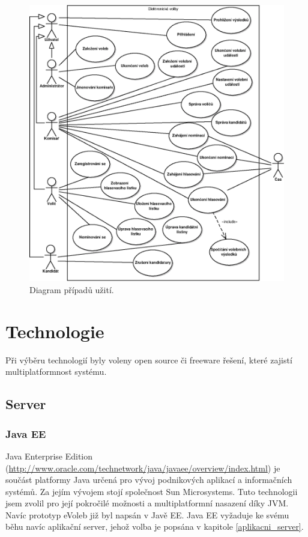 \documentclass[11pt,twoside,a4paper]{book}
\begin{document}
\begin{figure}[h!]
	\centering
	\includegraphics[scale=0.9]{diagrams/pripady_uziti.eps}
	\caption{Diagram případů užití.}
	\label{fig:pripady_uziti}
\end{figure}


\section{Technologie}

Při výběru technologií byly voleny open source či freeware řešení, které zajistí multiplatformnost systému.

\subsection{Server}

\subsubsection{Java EE}

Java Enterprise Edition (\url{http://www.oracle.com/technetwork/java/javaee/overview/index.html}) je součást platformy Java určená pro vývoj podnikových aplikací a informačních systémů. Za jejím vývojem stojí společnost Sun Microsystems. Tuto technologii jsem zvolil pro její pokročilé možnosti a multiplatformní nasazení díky JVM.  Navíc prototyp eVoleb již byl napsán v Javě EE. Java EE vyžaduje ke svému běhu navíc aplikační server, jehož volba je popsána v kapitole \ref{aplikacni_server}. 
\end{document}

